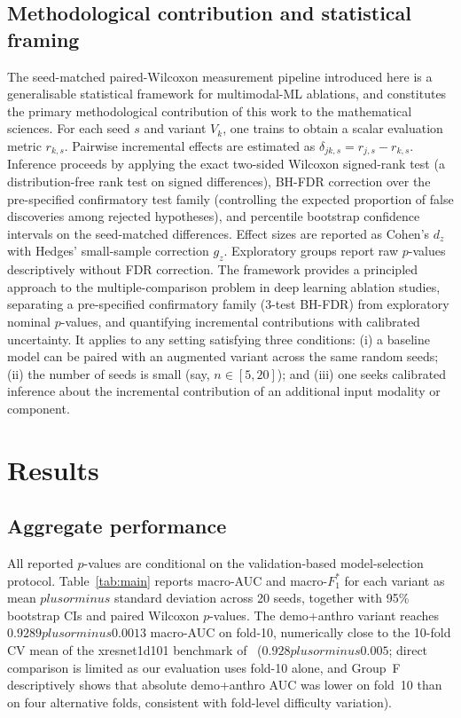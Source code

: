 \documentclass[mathematics,article,pdftex]{Definitions/mdpi}
\def\texttt#1{#1}%
\def\mathrm#1{#1}%
\def\pm{plus or minus }%
\begin{document}
\subsection{Methodological contribution and statistical framing}
The seed-matched paired-Wilcoxon measurement pipeline introduced here is a generalisable statistical framework for multimodal-ML ablations, and constitutes the primary methodological contribution of this work to the mathematical sciences. For each seed $s$ and variant $V_k$, one trains to obtain a scalar evaluation metric $r_{k,s}$. Pairwise incremental effects are estimated as $\delta_{jk,s} = r_{j,s} - r_{k,s}$. Inference proceeds by applying the exact two-sided Wilcoxon signed-rank test (a distribution-free rank test on signed differences), BH-FDR correction over the pre-specified confirmatory test family (controlling the expected proportion of false discoveries among rejected hypotheses), and percentile bootstrap confidence intervals on the seed-matched differences. Effect sizes are reported as Cohen's $d_{\mathrm{z}}$ with Hedges' small-sample correction $g_{\mathrm{z}}$. Exploratory groups report raw $p$-values descriptively without FDR correction. The framework provides a principled approach to the multiple-comparison problem in deep learning ablation studies, separating a pre-specified confirmatory family (3-test BH-FDR) from exploratory nominal $p$-values, and quantifying incremental contributions with calibrated uncertainty. It applies to any setting satisfying three conditions: (i) a baseline model can be paired with an augmented variant across the same random seeds; (ii) the number of seeds is small (say, $n \in [5, 20]$); and (iii) one seeks calibrated inference about the incremental contribution of an additional input modality or component.

\section{Results}\label{sec:results}

\subsection{Aggregate performance}
All reported $p$-values are conditional on the validation-based model-selection protocol.
Table~\ref{tab:main} reports macro-AUC and macro-$F_1^{\ast}$ for each variant as mean $\pm$ standard deviation across 20 seeds, together with 95\% bootstrap CIs and paired Wilcoxon $p$-values. The \texttt{demo+anthro} variant reaches $0.9289 \pm 0.0013$ macro-AUC on fold-10, numerically close to the 10-fold CV mean of the xresnet1d101 benchmark of~\cite{Strodthoff2021} ($0.928 \pm 0.005$; direct comparison is limited as our evaluation uses fold-10 alone, and Group~F descriptively shows that absolute demo+anthro AUC was lower on fold~10 than on four alternative folds, consistent with fold-level difficulty variation).
\end{document}
